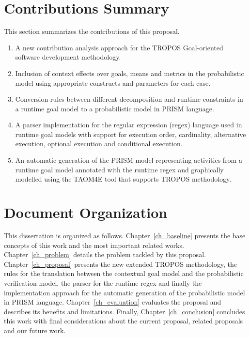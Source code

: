 \section{Contributions Summary}

This section summarizes the contributions of this proposal.


\begin{enumerate}

\item A new contribution analysis approach for the TROPOS Goal-oriented software development methodology.

\item Inclusion of context effects over goals, means and metrics in the probabilistic model using appropriate constructs and parameters for each case.

\item Conversion rules between different decomposition and runtime constraints in a runtime goal model to a probabilistic model in PRISM language.

\item A parser implementation for the regular expression (regex) language used in runtime goal models with support for execution order, cardinality, alternative execution, optional execution and conditional execution. 

\item An automatic generation of the PRISM model representing activities from a runtime goal model annotated with the runtime regex and graphically modelled using the TAOM4E tool that supports TROPOS methodology.

\end{enumerate}

\section{Document Organization}

This dissertation is organized as follows. Chapter~\ref{ch_baseline} presents the base concepts of this work and the most important related works. Chapter~\ref{ch_problem} details the problem tackled by this proposal. Chapter~\ref{ch_proposal} presents the new extended TROPOS methodology, the rules for the translation between the contextual goal model and the probabilistic verification model, the parser for the runtime regex and finally the implementation approach for the automatic generation of the probabilistic model in PRISM language. Chapter~\ref{ch_evaluation} evaluates the proposal and describes its benefits and limitations. Finally, Chapter~\ref{ch_conclusion} concludes this work with final considerations about the current proposal, related proposals and our future work.